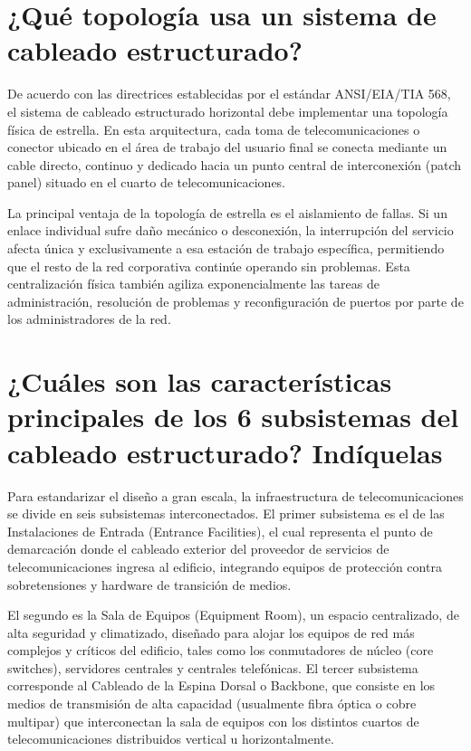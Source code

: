 \documentclass[a4paper,12pt]{article}
\begin{document}
\section{¿Qué topología usa un sistema de cableado estructurado?}

De acuerdo con las directrices establecidas por el estándar ANSI/EIA/TIA 568, el sistema de cableado estructurado horizontal debe implementar una topología física de estrella. En esta arquitectura, cada toma de telecomunicaciones o conector ubicado en el área de trabajo del usuario final se conecta mediante un cable directo, continuo y dedicado hacia un punto central de interconexión (patch panel) situado en el cuarto de telecomunicaciones.

La principal ventaja de la topología de estrella es el aislamiento de fallas. Si un enlace individual sufre daño mecánico o desconexión, la interrupción del servicio afecta única y exclusivamente a esa estación de trabajo específica, permitiendo que el resto de la red corporativa continúe operando sin problemas. Esta centralización física también agiliza exponencialmente las tareas de administración, resolución de problemas y reconfiguración de puertos por parte de los administradores de la red.

\newpage

\section{¿Cuáles son las características principales de los 6 subsistemas del cableado estructurado? Indíquelas}

Para estandarizar el diseño a gran escala, la infraestructura de telecomunicaciones se divide en seis subsistemas interconectados. El primer subsistema es el de las Instalaciones de Entrada (Entrance Facilities), el cual representa el punto de demarcación donde el cableado exterior del proveedor de servicios de telecomunicaciones ingresa al edificio, integrando equipos de protección contra sobretensiones y hardware de transición de medios.

El segundo es la Sala de Equipos (Equipment Room), un espacio centralizado, de alta seguridad y climatizado, diseñado para alojar los equipos de red más complejos y críticos del edificio, tales como los conmutadores de núcleo (core switches), servidores centrales y centrales telefónicas. El tercer subsistema corresponde al Cableado de la Espina Dorsal o Backbone, que consiste en los medios de transmisión de alta capacidad (usualmente fibra óptica o cobre multipar) que interconectan la sala de equipos con los distintos cuartos de telecomunicaciones distribuidos vertical u horizontalmente.
\end{document}
